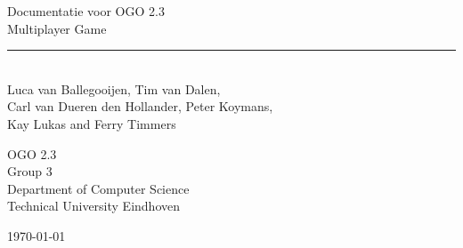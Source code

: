 \begin{titlepage}
	\begin{center}
		
		{\Huge Documentatie voor OGO 2.3\\ Multiplayer Game}\\[0.5cm]
		\rule{\linewidth}{0.5mm}\\[0.5cm]
		
		
		{\Large
		Luca van Ballegooijen, Tim van Dalen, \\
		Carl van Dueren den Hollander, Peter Koymans,\\
		Kay Lukas and Ferry Timmers\\[1cm]
		}
		
		{\large
		OGO 2.3\\
		Group 3 \\[1cm]
		Department of Computer Science\\
		Technical University Eindhoven\\[1cm]
		}
		
		

		\vfill

		{\large \today}
	\end{center}
\end{titlepage}
